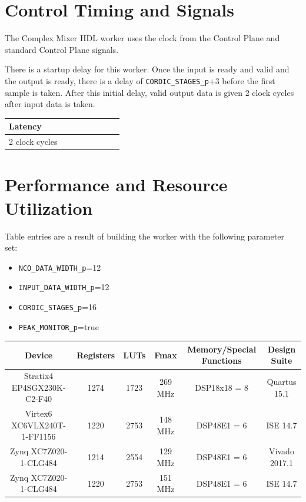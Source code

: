 \documentclass{article}
\begin{document}
\section*{Control Timing and Signals}
\begin{flushleft}
	The Complex Mixer HDL worker uses the clock from the Control Plane and standard Control Plane signals.\medskip

	There is a startup delay for this worker. Once the input is ready and valid and the output is ready, there is a delay of \verb+CORDIC_STAGES_p++3 before the first sample is taken. After this initial delay, valid output data is given 2 clock cycles after input data is taken.

	\begin{tabular}{|M{4.5cm}|M{1cm}|M{1cm}|M{1.5cm}|M{2cm}|M{1cm}|M{1cm}|M{2.5cm}|}
		\hline
		Latency         \\
		 clock cycles  \\
		\hline
	\end{tabular}
\end{flushleft}

\section*{Performance and Resource Utilization}
Table entries are a result of building the worker with the following parameter set:\
\begin{itemize}
	\item \verb+NCO_DATA_WIDTH_p+=12
	\item \verb+INPUT_DATA_WIDTH_p+=12
	\item \verb+CORDIC_STAGES_p+=16
	\item \verb+PEAK_MONITOR_p+=true
\end{itemize}

\begin{scriptsize}
	\begin{tabular}{|c|c|c|c|c|c|}
		\hline
		\rowcolor{blue}
		Device                      & Registers & LUTs & Fmax    & Memory/Special Functions & Design Suite    \\
		\hline
		Stratix4 EP4SGX230K-C2-F40  & 1274      & 1723 & 269 MHz       & DSP18x18 = 8             & Quartus 15.1 \\
		\hline
		Virtex6 XC6VLX240T-1-FF1156 & 1220      & 2753 & 148 MHz &  DSP48E1 = 6  & ISE 14.7        \\
		\hline
		Zynq XC7Z020-1-CLG484       & 1214      & 2554 & 129 MHz & DSP48E1 = 6              & Vivado 2017.1        \\
		\hline
		Zynq XC7Z020-1-CLG484       & 1220      & 2753 & 151 MHz & DSP48E1 = 6              & ISE 14.7        \\
		\hline
	\end{tabular}
\end{scriptsize}
\end{document}
